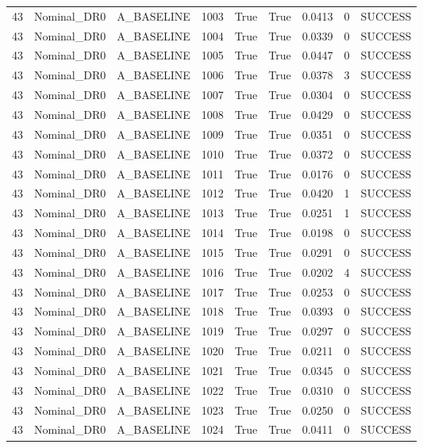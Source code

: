 \documentclass[11pt,a4paper,oneside]{book}
\begin{document}
\begin{longtable}{l l l l l l l l l}
43 & Nominal\_DR0 & A\_BASELINE & 1003 & True & True & 0.0413 & 0 & SUCCESS \\
43 & Nominal\_DR0 & A\_BASELINE & 1004 & True & True & 0.0339 & 0 & SUCCESS \\
43 & Nominal\_DR0 & A\_BASELINE & 1005 & True & True & 0.0447 & 0 & SUCCESS \\
43 & Nominal\_DR0 & A\_BASELINE & 1006 & True & True & 0.0378 & 3 & SUCCESS \\
43 & Nominal\_DR0 & A\_BASELINE & 1007 & True & True & 0.0304 & 0 & SUCCESS \\
43 & Nominal\_DR0 & A\_BASELINE & 1008 & True & True & 0.0429 & 0 & SUCCESS \\
43 & Nominal\_DR0 & A\_BASELINE & 1009 & True & True & 0.0351 & 0 & SUCCESS \\
43 & Nominal\_DR0 & A\_BASELINE & 1010 & True & True & 0.0372 & 0 & SUCCESS \\
43 & Nominal\_DR0 & A\_BASELINE & 1011 & True & True & 0.0176 & 0 & SUCCESS \\
43 & Nominal\_DR0 & A\_BASELINE & 1012 & True & True & 0.0420 & 1 & SUCCESS \\
43 & Nominal\_DR0 & A\_BASELINE & 1013 & True & True & 0.0251 & 1 & SUCCESS \\
43 & Nominal\_DR0 & A\_BASELINE & 1014 & True & True & 0.0198 & 0 & SUCCESS \\
43 & Nominal\_DR0 & A\_BASELINE & 1015 & True & True & 0.0291 & 0 & SUCCESS \\
43 & Nominal\_DR0 & A\_BASELINE & 1016 & True & True & 0.0202 & 4 & SUCCESS \\
43 & Nominal\_DR0 & A\_BASELINE & 1017 & True & True & 0.0253 & 0 & SUCCESS \\
43 & Nominal\_DR0 & A\_BASELINE & 1018 & True & True & 0.0393 & 0 & SUCCESS \\
43 & Nominal\_DR0 & A\_BASELINE & 1019 & True & True & 0.0297 & 0 & SUCCESS \\
43 & Nominal\_DR0 & A\_BASELINE & 1020 & True & True & 0.0211 & 0 & SUCCESS \\
43 & Nominal\_DR0 & A\_BASELINE & 1021 & True & True & 0.0345 & 0 & SUCCESS \\
43 & Nominal\_DR0 & A\_BASELINE & 1022 & True & True & 0.0310 & 0 & SUCCESS \\
43 & Nominal\_DR0 & A\_BASELINE & 1023 & True & True & 0.0250 & 0 & SUCCESS \\
43 & Nominal\_DR0 & A\_BASELINE & 1024 & True & True & 0.0411 & 0 & SUCCESS \\

\end{longtable}
\end{document}
